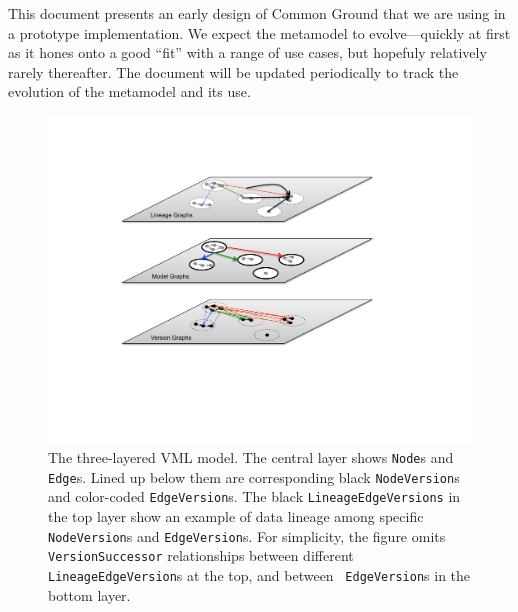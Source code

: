 \documentclass{article}
\newcommand{\vml}{VML\xspace}
\newcommand{\node}{\texttt{Node}\xspace}
\newcommand{\edge}{\texttt{Edge}\xspace}
\begin{document}
This document presents an early design of Common Ground that we are using in a prototype implementation.  We expect the metamodel to evolve---quickly at first as it hones onto a good ``fit'' with a range of use cases, but hopefuly relatively rarely thereafter.  The document will be updated periodically to track the evolution of the metamodel and its use.

\begin{figure}[th]
\centering
\includegraphics[width=0.75\linewidth]{layers.pdf}
\caption{The three-layered \vml model.  The central layer shows {\node}s and {\edge}s.  
Lined up below them are corresponding black \texttt{NodeVersion}s and color-coded \texttt{EdgeVersion}s.  
The black \texttt{LineageEdgeVersions} in the top layer show an example of data lineage among specific \texttt{NodeVersion}s and \texttt{EdgeVersion}s.  For simplicity, the figure omits \texttt{VersionSuccessor} relationships between different \texttt{LineageEdgeVersion}s at the top, and between \
\texttt{EdgeVersion}s in the bottom layer.}
\label{fig:layers}
\end{figure}
\end{document}

